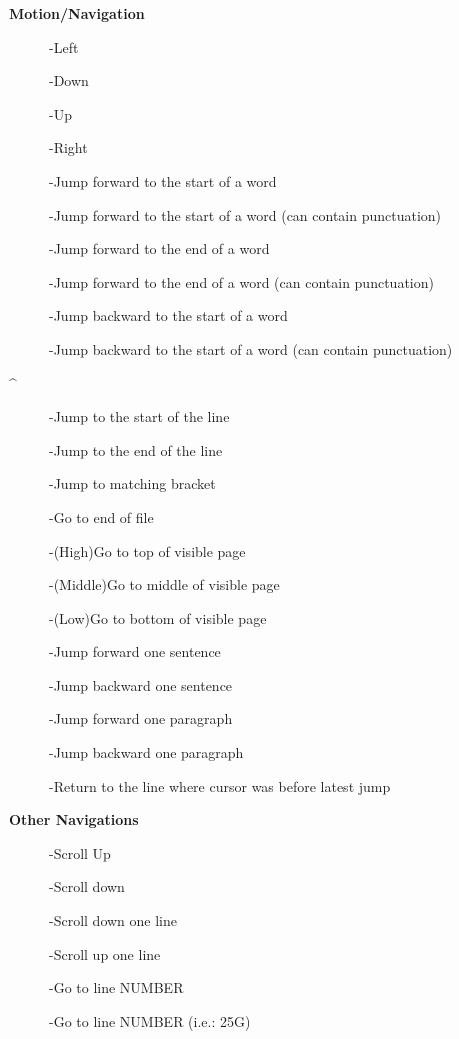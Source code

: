 \documentclass{article}
\begin{document}
\begin{multicols}{2}
\begin{center}
\textbf{Motion/Navigation}
\end{center}
\begin{description}
\item[] 
-Left
\item[]
-Down
\item[]
-Up
\item[] 
-Right
\item[]
-Jump forward to the start of a word
\item[] 
-Jump forward to the start of a word (can contain punctuation)
\item[]
-Jump forward to the end of a word
\item[]
-Jump forward to the end of a word (can contain punctuation)
\item[]
-Jump backward to the start of a word
\item[] 
-Jump backward to the start of a word (can contain punctuation)
\item[ \^]
-Jump to the start of the line
\item[\ttfamily{\$}]
-Jump to the end of the line
\item[\ttfamily{\%}]
-Jump to matching bracket
\item[]
-Go to end of file
\item[]
-(High)Go to top of visible page
\item[]
-(Middle)Go to middle of visible page
\item[]
-(Low)Go to bottom of visible page
\item[\ttfamily{(}]
-Jump forward one sentence
\item[\ttfamily{)}]
-Jump backward one sentence
\item[\ttfamily{\{}]
-Jump forward one paragraph
\item[\ttfamily{\}}]
-Jump backward one paragraph
\item[]
-Return to the line where cursor was before latest jump
\end{description}

\begin{center}
\textbf{Other Navigations}
\end{center}
\begin{description}
\item[]
-Scroll Up
\item[]
-Scroll down
\item[]
-Scroll down one line
\item[]
-Scroll up one line
\item[]
-Go to line NUMBER
\item[] 
-Go to line NUMBER (i.e.: 25G)
\end{description}
\end{multicols}
\end{document}

